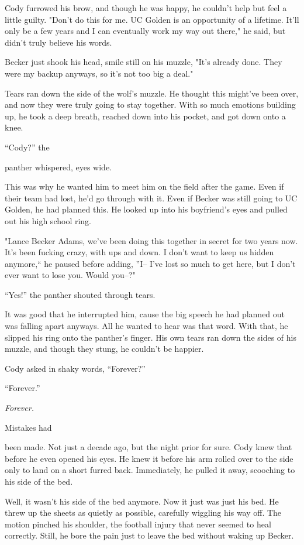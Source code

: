 Cody furrowed his brow, and though he was happy, he couldn't help but
feel a little guilty. "Don't do this for me. UC Golden is an opportunity
of a lifetime. It'll only be a few years and I can eventually work my
way out there," he said, but didn't truly believe his words.

Becker just shook his head, smile still on his muzzle, "It's already
done. They were my backup anyways, so it's not too big a deal."

Tears ran down the side of the wolf's muzzle. He thought this might've
been over, and now they were truly going to stay together. With so much
emotions building up, he took a deep breath, reached down into his
pocket, and got down onto a knee.

``Cody?'' the

panther whispered, eyes wide.

This was why he wanted him to meet him on the field after the game. Even
if their team had lost, he'd go through with it. Even if Becker was
still going to UC Golden, he had planned this. He looked up into his
boyfriend's eyes and pulled out his high school ring.

"Lance Becker Adams, we've been doing this together in secret for two
years now. It's been fucking crazy, with ups and down. I don't want to
keep us hidden anymore,`` he paused before adding, ''I-- I've lost so
much to get here, but I don't ever want to lose you. Would you--?"

``Yes!'' the panther shouted through tears.

It was good that he interrupted him, cause the big speech he had planned
out was falling apart anyways. All he wanted to hear was that word. With
that, he slipped his ring onto the panther's finger. His own tears ran
down the sides of his muzzle, and though they stung, he couldn't be
happier.

Cody asked in shaky words, ``Forever?''

``Forever.''

\emph{Forever.}

\secdiv

Mistakes had

been made. Not just a decade ago, but the night prior for sure. Cody
knew that before he even opened his eyes. He knew it before his arm
rolled over to the side only to land on a short furred back.
Immediately, he pulled it away, scooching to his side of the bed.

Well, it wasn't his side of the bed anymore. Now it just was just his
bed. He threw up the sheets as quietly as possible, carefully wiggling
his way off. The motion pinched his shoulder, the football injury that
never seemed to heal correctly. Still, he bore the pain just to leave
the bed without waking up Becker.

